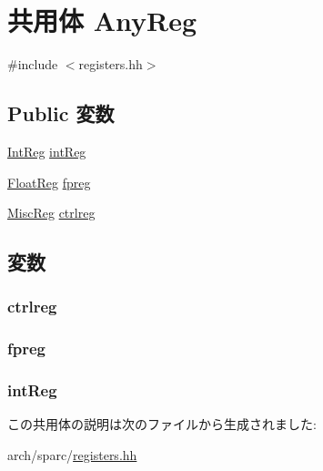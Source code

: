 \hypertarget{unionSparcISA_1_1AnyReg}{
\section{共用体 AnyReg}
\label{unionSparcISA_1_1AnyReg}
}


{\ttfamily \#include $<$registers.hh$>$}\subsection*{Public 変数}
\begin{DoxyCompactItemize}
\item 
\hyperlink{namespaceSparcISA_a0e080577527fb3e9685399f75b5caf15}{IntReg} \hyperlink{unionSparcISA_1_1AnyReg_a5889511f36b8bd7e83c3336195dff8a4}{intReg}
\item 
\hyperlink{namespaceSparcISA_a449d6bb660f5ca613cf359f05d81a20f}{FloatReg} \hyperlink{unionSparcISA_1_1AnyReg_a9154b30def3ee5315e8660e1a491c681}{fpreg}
\item 
\hyperlink{namespaceSparcISA_aa16539aa6584fd12f7d6fa868f75b4de}{MiscReg} \hyperlink{unionSparcISA_1_1AnyReg_ae69c08de24012a3af86f0f33249f321d}{ctrlreg}
\end{DoxyCompactItemize}


\subsection{変数}
\hypertarget{unionSparcISA_1_1AnyReg_ae69c08de24012a3af86f0f33249f321d}{
\subsubsection[{ctrlreg}]{ {\bf ctrlreg}}}
\label{unionSparcISA_1_1AnyReg_ae69c08de24012a3af86f0f33249f321d}
\hypertarget{unionSparcISA_1_1AnyReg_a9154b30def3ee5315e8660e1a491c681}{
\subsubsection[{fpreg}]{ {\bf fpreg}}}
\label{unionSparcISA_1_1AnyReg_a9154b30def3ee5315e8660e1a491c681}
\hypertarget{unionSparcISA_1_1AnyReg_a5889511f36b8bd7e83c3336195dff8a4}{
\subsubsection[{intReg}]{ {\bf intReg}}}
\label{unionSparcISA_1_1AnyReg_a5889511f36b8bd7e83c3336195dff8a4}


この共用体の説明は次のファイルから生成されました:\begin{DoxyCompactItemize}
\item 
arch/sparc/\hyperlink{sparc_2registers_8hh}{registers.hh}\end{DoxyCompactItemize}
